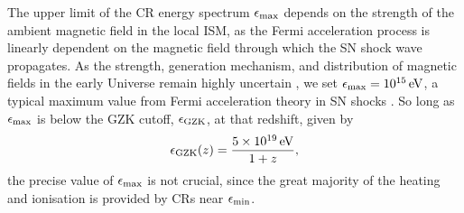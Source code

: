 \documentclass[usenatbib]{mn2e}
\newcommand{\ev}{\,{\rm eV}}
\begin{document}
The upper limit of the CR energy spectrum $\epsilon_{\rm max}$ depends on the strength of the ambient magnetic field in the local ISM, as the Fermi acceleration process is linearly dependent on the magnetic field through which the SN shock wave propagates. 
As the strength, generation mechanism, and distribution of magnetic fields in the early Universe remain highly uncertain \citep{DurrerNeronov2013}, we set $\epsilon_{\rm max} = 10^{15}\ev$, a typical maximum value from Fermi acceleration theory in SN shocks \citep[e.g.,][]{BlandfordEichler1987}.  
So long as $\epsilon_{\rm max}$ is below the GZK cutoff, $\epsilon_{\rm \small GZK}$, at that redshift, given by \citep{StacyBromm2007}
\begin{equation}
\epsilon_{\rm \small GZK}(z) = \frac{5\times10^{19}\ev}{1+z},
\end{equation}
the precise value of $\epsilon_{\rm max}$ is not crucial, since the great majority of the heating and ionisation is provided by CRs near $\epsilon_{\rm min}$.
\end{document}
